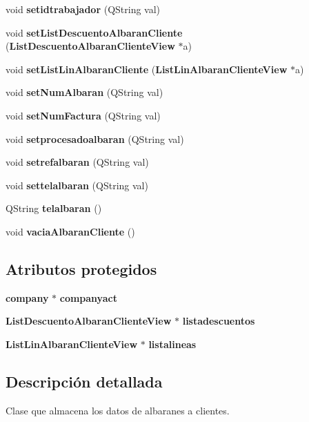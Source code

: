 \begin{CompactItemize}
\item 
void {\bf setidtrabajador} (QString val)\label{classAlbaranCliente_a49}

\item 
void {\bf set\-List\-Descuento\-Albaran\-Cliente} ({\bf List\-Descuento\-Albaran\-Cliente\-View} $\ast$a)\label{classAlbaranCliente_a50}

\item 
void {\bf set\-List\-Lin\-Albaran\-Cliente} ({\bf List\-Lin\-Albaran\-Cliente\-View} $\ast$a)
\item 
void {\bf set\-Num\-Albaran} (QString val)\label{classAlbaranCliente_a52}

\item 
void {\bf set\-Num\-Factura} (QString val)\label{classAlbaranCliente_a53}

\item 
void {\bf setprocesadoalbaran} (QString val)\label{classAlbaranCliente_a54}

\item 
void {\bf setrefalbaran} (QString val)\label{classAlbaranCliente_a55}

\item 
void {\bf settelalbaran} (QString val)\label{classAlbaranCliente_a56}

\item 
QString {\bf telalbaran} ()\label{classAlbaranCliente_a57}

\item 
void {\bf vacia\-Albaran\-Cliente} ()\label{classAlbaranCliente_a58}

\end{CompactItemize}
\subsection*{Atributos protegidos}
\begin{CompactItemize}
\item 
{\bf company} $\ast$ {\bf companyact}\label{classAlbaranCliente_p0}

\item 
{\bf List\-Descuento\-Albaran\-Cliente\-View} $\ast$ {\bf listadescuentos}\label{classAlbaranCliente_p1}

\item 
{\bf List\-Lin\-Albaran\-Cliente\-View} $\ast$ {\bf listalineas}\label{classAlbaranCliente_p2}

\end{CompactItemize}


\subsection{Descripci\'{o}n detallada}
Clase que almacena los datos de albaranes a clientes. 



